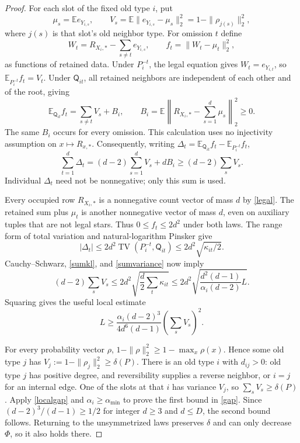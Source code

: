 \documentclass[11pt]{article}
\newcommand{\E}{\mathbb E}
\newcommand{\TV}{\operatorname{TV}}
\begin{document}
\begin{proof}
For each slot of the fixed old type $i$, put
\[
 \mu_s=\E e_{Y_{i,s}},\qquad
 V_s=\E\|e_{Y_{i,s}}-\mu_s\|_2^2
     =1-\|\rho_{j(s)}\|_2^2,
\]
where $j(s)$ is that slot's old neighbor type. For omission $t$ define
\[
 W_t=R_{X_i,*}-\sum_{s\ne t}e_{Y_{i,s}},\qquad
 f_t=\|W_t-\mu_t\|_2^2,
\]
as functions of retained data. Under $P_i^{-t}$, the legal equation
gives $W_t=e_{Y_{i,t}}$, so $\E_{P_i^{-t}}f_t=V_t$. Under
$\mathsf Q_{it}$, all retained neighbors are independent of each other
and of the root, giving
\begin{equation}
 \E_{\mathsf Q_{it}}f_t
 =\sum_{s\ne t}V_s+B_i,\qquad
 B_i=\E\left\|R_{X_i,*}-\sum_{s=1}^d\mu_s\right\|_2^2\geq0.
                                                        \label{variance}
\end{equation}
The same $B_i$ occurs for every omission. This calculation uses no
injectivity assumption on $x\mapsto R_{x,*}$.
Consequently, writing $\Delta_t=\E_{\mathsf Q_{it}}f_t-
\E_{P_i^{-t}}f_t$,
\begin{equation}
 \sum_{t=1}^d\Delta_t=(d-2)\sum_{s=1}^d V_s+dB_i
                  \geq(d-2)\sum_sV_s.              \label{sumvariance}
\end{equation}
Individual $\Delta_t$ need not be nonnegative; only this sum is used.

Every occupied row $R_{X_i,*}$ is a nonnegative count vector of mass $d$
by \eqref{legal}. The retained sum plus $\mu_t$ is another nonnegative
vector of mass $d$, even on auxiliary tuples that are not legal stars.
Thus $0\leq f_t\leq2d^2$ under both laws. The range form of total
variation and natural-logarithm Pinsker give
\[
 |\Delta_t|\leq2d^2\TV(P_i^{-t},\mathsf Q_{it})
               \leq2d^2\sqrt{\kappa_{it}/2}.
\]
Cauchy--Schwarz, \eqref{sumkl}, and \eqref{sumvariance} now imply
\[
 (d-2)\sum_sV_s
 \leq2d^2\sqrt{\frac d2\sum_t\kappa_{it}}
 \leq2d^2\sqrt{\frac{d^2(d-1)}{\alpha_i(d-2)}L}.
\]
Squaring gives the useful local estimate
\begin{equation}
 L\geq\frac{\alpha_i(d-2)^3}{4d^6(d-1)}
             \left(\sum_sV_s\right)^2.              \label{localgap}
\end{equation}

For every probability vector $\rho$,
$1-\|\rho\|_2^2\geq1-\max_x\rho(x)$. Hence some old type $j$ has
$V_j:=1-\|\rho_j\|_2^2\geq\delta(P)$. There is an old type $i$ with
$d_{ij}>0$: old type $j$ has positive degree, and reversibility supplies
a reverse neighbor, or $i=j$ for an internal edge. One of the slots at
that $i$ has variance $V_j$, so $\sum_sV_s\geq\delta(P)$. Apply
\eqref{localgap} and $\alpha_i\geq\alpha_{\min}$ to prove the first
bound in \eqref{gap}. Since $(d-2)^3/(d-1)\geq1/2$ for integer $d\geq3$
and $d\leq D$, the second bound follows. Returning to the unsymmetrized
laws preserves $\delta$ and can only decrease $\Phi$, so it also holds
there.


\end{proof}
\end{document}
